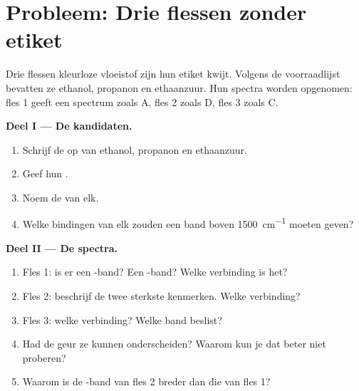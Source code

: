 \section{Probleem: Drie flessen zonder etiket}

\begin{problem}
\label{pb:g11:infrared:1}
Drie flessen kleurloze vloeistof zijn hun etiket kwijt. Volgens de
voorraadlijst bevatten ze ethanol, propanon en ethaanzuur. Hun spectra
worden opgenomen: fles 1 geeft een spectrum zoals A, fles 2 zoals D,
fles 3 zoals C.

\medskip
\noindent\textbf{Deel I --- De kandidaten.}
\begin{enumerate}
  \item Schrijf de  op van ethanol, propanon en
        ethaanzuur.
  \item Geef hun .
  \item Noem de  van elk.
  \item Welke bindingen van elk zouden een band boven
        \qty{1500}{cm^{-1}} moeten geven?
\end{enumerate}

\medskip
\noindent\textbf{Deel II --- De spectra.}
\begin{enumerate}[resume]
  \item Fles 1: is er een -band? Een -band? Welke
        verbinding is het?
  \item Fles 2: beschrijf de twee sterkste kenmerken. Welke verbinding?
  \item Fles 3: welke verbinding? Welke band beslist?
  \item Had de geur ze kunnen onderscheiden? Waarom kun je dat beter niet
        proberen?
  \item Waarom is de -band van fles 2 breder dan die van fles 1?
\end{enumerate}


\end{problem}
